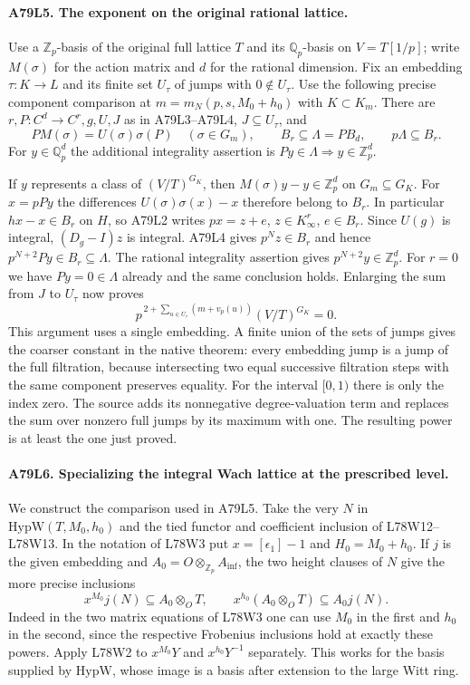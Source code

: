 \paragraph{A79L5. The exponent on the original rational lattice.}
Use a $\mathbb Z_p$-basis of the original full lattice $T$ and its
$\mathbb Q_p$-basis on $V=T[1/p]$; write $M(\sigma)$ for the
action matrix and $d$ for the rational dimension.
Fix an embedding $\tau:K\to L$ and its finite set $U_\tau$ of jumps
with $0\notin U_\tau$. Use the following precise component comparison
at $m=m_N(p,s,M_0+h_0)$ with $K\subset K_m$.
There are $r,P:C^d\to C^r,g,U,J$ as in A79L3--A79L4,
$J\subseteq U_\tau$, and
\[
 P M(\sigma)=U(\sigma)\sigma(P)\quad(\sigma\in G_m),\qquad
 B_r\subseteq\Lambda=P B_d,\qquad p\Lambda\subseteq B_r.
\]
For $y\in\mathbb Q_p^d$ the additional integrality assertion is
$Py\in\Lambda\Rightarrow y\in\mathbb Z_p^d$.

If $y$ represents a class of $(V/T)^{G_K}$, then
$M(\sigma)y-y\in\mathbb Z_p^d$ on $G_m\subseteq G_K$.
For $x=pPy$ the differences $U(\sigma)\sigma(x)-x$ therefore
belong to $B_r$. In particular $hx-x\in B_r$ on $H$, so A79L2
writes $p x=z+e$, $z\in K_\infty^r$, $e\in B_r$. Since
$U(g)$ is integral, $(D_g-I)z$ is integral. A79L4 gives
$p^Nz\in B_r$ and hence $p^{N+2}Py\in B_r\subseteq\Lambda$.
The rational integrality assertion gives $p^{N+2}y\in\mathbb Z_p^d$.
For $r=0$ we have $Py=0\in\Lambda$ already and the same conclusion
holds. Enlarging the sum from $J$ to $U_\tau$ now proves
\[
 p^{\,2+\sum_{u\in U_\tau}(m+v_p(u))}(V/T)^{G_K}=0 .
\]
This argument uses a single embedding. A finite union of the sets of
jumps gives the coarser constant in the native theorem: every embedding
jump is a jump of the full filtration, because intersecting two equal
successive filtration steps with the same component preserves equality.
For the interval $[0,1)$ there is only the index zero. The source
adds its nonnegative degree-valuation term and replaces the sum over
nonzero full jumps by its maximum with one. The resulting power is
at least the one just proved.

\paragraph{A79L6. Specializing the integral Wach lattice at the prescribed level.}
We construct the comparison used in A79L5. Take the very $N$ in
$\mathrm{HypW}(T,M_0,h_0)$ and the tied functor and coefficient
inclusion of L78W12--L78W13. In the notation of L78W3 put
$x=[\epsilon_1]-1$ and $H_0=M_0+h_0$. If $j$ is the
given embedding and $A_0=O\otimes_{\mathbb Z_p} A_{\inf}$,
the two height clauses of $N$ give the more precise inclusions
\[
 x^{M_0}j(N)\subseteq A_0\otimes_O T,\qquad
 x^{h_0}(A_0\otimes_O T)\subseteq A_0j(N).
\]
Indeed in the two matrix equations of L78W3 one can use $M_0$
in the first and $h_0$ in the second, since the respective
Frobenius inclusions hold at exactly these powers. Apply L78W2 to
$x^{M_0}Y$ and $x^{h_0}Y^{-1}$ separately. This works for the
basis supplied by $\mathrm{HypW}$, whose image is a basis after
extension to the large Witt ring.

